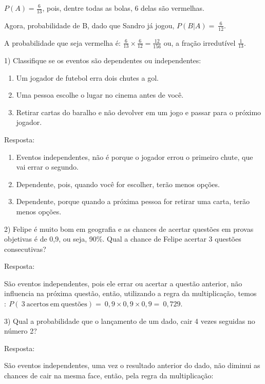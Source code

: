 {\(P(A) = \frac{6}{13}\), pois, dentre todas as bolas, 6 delas são
vermelhas.

Agora, probabilidade de B, dado que Sandro já jogou,
\(P(B|A) = \ \frac{6}{12}\).

A probabilidade que seja vermelha é:
\(\frac{6}{13} \times \frac{6}{12} = \frac{12}{156}\) ou, a fração
irredutível \(\frac{1}{13}\).


1) Classifique se os eventos são dependentes ou independentes:

\begin{enumerate}
\def\labelenumi{\alph{enumi})}
\item
  Um jogador de futebol erra dois chutes a gol.
\item
  Uma pessoa escolhe o lugar no cinema antes de você.
\item
  Retirar cartas do baralho e não devolver em um jogo e passar para o
  próximo jogador.
\end{enumerate}

Resposta:

\begin{enumerate}
\def\labelenumi{\alph{enumi})}
\item
  Eventos independentes, não é porque o jogador errou o primeiro chute,
  que vai errar o segundo.
\item
  Dependente, pois, quando você for escolher, terão menos opções.
\item
  Dependente, porque quando a próxima pessoa for retirar uma carta,
  terão menos opções.
\end{enumerate}

2) Felipe é muito bom em geografia e as chances de acertar questões em
provas objetivas é de 0,9, ou seja, 90\%. Qual a chance de Felipe
acertar 3 questões consecutivas?

Resposta:

São eventos independentes, pois ele errar ou acertar a questão anterior,
não influencia na próxima questão, então, utilizando a regra da
multiplicação,
temos\(:\ P(\ 3\ \text{acertos}\ \text{em}\ \text{quest}õ\text{es}) = \ 0,9 \times 0,9 \times 0,9 = \ 0,729.\)

3) Qual a probabilidade que o lançamento de um dado, cair 4 vezes
seguidas no número 2?

Resposta:

São eventos independentes, uma vez o resultado anterior do dado, não
diminui as chances de cair na mesma face, então, pela regra da
multiplicação:

}
